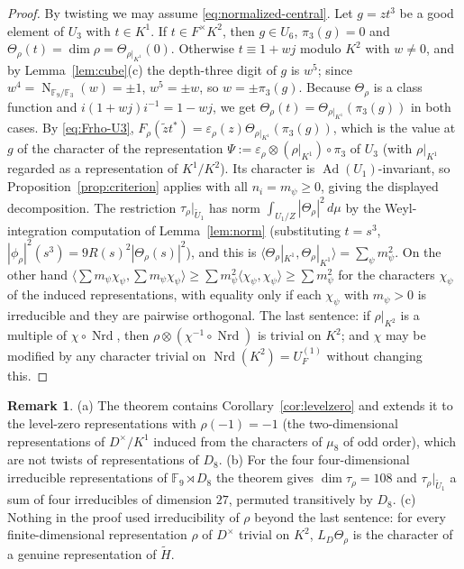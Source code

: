 \documentclass[11pt]{article}
\newcommand{\Fq}{\mathbb F}
\newcommand{\Nm}{\operatorname N}
\newcommand{\Nrd}{\operatorname{Nrd}}
\newcommand{\Ad}{\operatorname{Ad}}
\newcommand{\tH}{\widetilde H}
\newcommand{\tU}{\widetilde U}
\theoremstyle{plain}
\theoremstyle{definition}
\newtheorem{remark}[theorem]{Remark}
\begin{document}
\begin{proof}
By twisting we may assume \eqref{eq:normalized-central}.  Let $g=zt^3$
be a good element of $U_3$ with $t\in K^1$.  If $t\in F^\times K^2$, then
$g\in U_6$, $\pi_3(g)=0$ and $\Theta_\rho(t)=\dim\rho=\Theta_{\rho|_{K^1}}(0)$.
Otherwise $t\equiv1+wj$ modulo $K^2$ with $w\ne0$, and by
Lemma~\ref{lem:cube}(c) the depth-three digit of $g$ is $w^5$; since
$w^4=\Nm_{\Fq_9/\Fq_3}(w)=\pm1$, $w^5=\pm w$, so $w=\pm\pi_3(g)$.  Because
$\Theta_\rho$ is a class function and $i(1+wj)i^{-1}=1-wj$, we get
$\Theta_\rho(t)=\Theta_{\rho|_{K^1}}(\pi_3(g))$ in both cases.  By
\eqref{eq:Frho-U3}, $F_\rho(\tilde zt^*)=\varepsilon_\rho(z)\Theta_{\rho|_{K^1}}(\pi_3(g))$,
which is the value at $g$ of the character of the representation
$\Psi:=\varepsilon_\rho\otimes(\rho|_{K^1})\circ\pi_3$ of $U_3$ (with
$\rho|_{K^1}$ regarded as a representation of $K^1/K^2$).  Its character
is $\Ad(U_1)$-invariant, so Proposition~\ref{prop:criterion} applies
with all $n_i=m_\psi\ge0$, giving the displayed decomposition.
The restriction $\tau_\rho|_{\tU_1}$ has norm
$\int_{U_1/Z}|\Theta_\rho|^2\,d\mu$ by the Weyl-integration computation
of Lemma~\ref{lem:norm} (substituting $t=s^3$, $|\phi_\rho|^2(s^3)=9R(s)^2|\Theta_\rho(s)|^2$),
and this is $\langle\Theta_\rho|_{K^1},\Theta_\rho|_{K^1}\rangle=\sum_\psi m_\psi^2$.
On the other hand $\langle\sum m_\psi\chi_\psi,\sum m_\psi\chi_\psi\rangle\ge\sum m_\psi^2\langle\chi_\psi,\chi_\psi\rangle\ge\sum m_\psi^2$
for the characters $\chi_\psi$ of the induced representations, with
equality only if each $\chi_\psi$ with $m_\psi>0$ is irreducible and
they are pairwise orthogonal.  The last sentence: if $\rho|_{K^2}$ is a multiple of
$\chi\circ\Nrd$, then $\rho\otimes(\chi^{-1}\circ\Nrd)$ is trivial on
$K^2$; and $\chi$ may be modified by any character trivial on
$\Nrd(K^2)=U_F^{(1)}$ without changing this.
\end{proof}

\begin{remark}
(a) The theorem contains Corollary~\ref{cor:levelzero} and extends it to
the level-zero representations with $\rho(-1)=-1$ (the two-dimensional
representations of $D^\times/K^1$ induced from the characters of
$\mu_8$ of odd order), which are not twists of representations of $D_8$.
(b) For the four four-dimensional irreducible representations of
$\Fq_9\rtimes D_8$ the theorem gives $\dim\tau_\rho=108$ and
$\tau_\rho|_{\tU_1}$ a sum of four irreducibles of dimension $27$,
permuted transitively by $D_8$.
(c) Nothing in the proof used irreducibility of $\rho$ beyond the last
sentence: for every finite-dimensional representation $\rho$ of
$D^\times$ trivial on $K^2$, $L_D\Theta_\rho$ is the character of a
genuine representation of $\tH$.
\end{remark}
\end{document}
